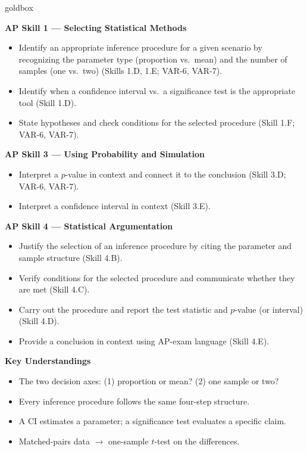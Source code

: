 \documentclass[10pt]{article}
\begin{document}
\begin{skillbox}{goldbox}
\begin{minipage}[t]{0.48\linewidth}
    \textbf{AP Skill 1 --- Selecting Statistical Methods}
    \begin{itemize}
        \item Identify an appropriate inference procedure for a given scenario by recognizing
              the parameter type (proportion vs.\ mean) and the number of samples (one vs.\ two)
              (Skills 1.D, 1.E; VAR-6, VAR-7).
        \item Identify when a confidence interval vs.\ a significance test is the
              appropriate tool (Skill 1.D).
        \item State hypotheses and check conditions for the selected procedure
              (Skill 1.F; VAR-6, VAR-7).
    \end{itemize}
    \textbf{AP Skill 3 --- Using Probability and Simulation}
    \begin{itemize}
        \item Interpret a $p$-value in context and connect it to the conclusion
              (Skill 3.D; VAR-6, VAR-7).
        \item Interpret a confidence interval in context (Skill 3.E).
    \end{itemize}
\end{minipage}
\hfill
\begin{minipage}[t]{0.48\linewidth}
    \textbf{AP Skill 4 --- Statistical Argumentation}
    \begin{itemize}
        \item Justify the selection of an inference procedure by citing the parameter and
              sample structure (Skill 4.B).
        \item Verify conditions for the selected procedure and communicate whether they are
              met (Skill 4.C).
        \item Carry out the procedure and report the test statistic and $p$-value (or interval)
              (Skill 4.D).
        \item Provide a conclusion in context using AP-exam language (Skill 4.E).
    \end{itemize}
    \textbf{Key Understandings}
    \begin{itemize}
        \item The two decision axes: (1) proportion or mean? (2) one sample or two?
        \item Every inference procedure follows the same four-step structure.
        \item A CI estimates a parameter; a significance test evaluates a specific claim.
        \item Matched-pairs data $\to$ one-sample $t$-test on the differences.
    \end{itemize}
\end{minipage}
\end{skillbox}
\end{document}
